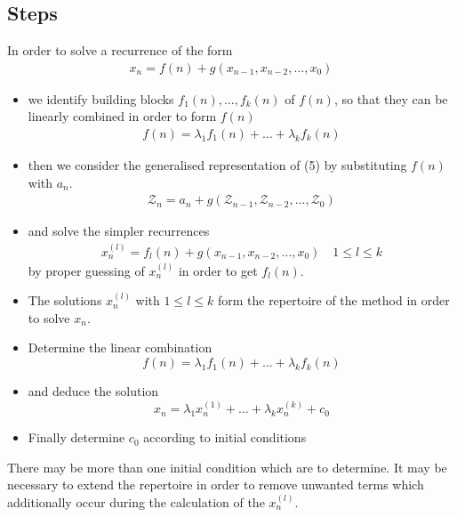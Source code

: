 \subsection{Steps}
In order to solve a recurrence of the form
\begin{align*}
x_n=f(n)+g(x_{n-1},x_{n-2},\ldots,x_0)\tag{5}
\end{align*}
\begin{itemize}
    \item we identify building blocks $f_1(n),\ldots,f_k(n)$ of $f(n)$, so that they can be linearly combined in order to form $f(n)$
    \begin{align*}
    f(n)=\lambda_1 f_1(n)+\ldots+\lambda_k f_k(n)
    \end{align*}
    
    \item then we consider the generalised representation of (5) by substituting $f(n)$ with $a_n$.
    \begin{align*}
    \mathcal{Z}_n=a_n+g(\mathcal{Z}_{n-1},\mathcal{Z}_{n-2},\ldots,\mathcal{Z}_0)
    \end{align*}
    
    \item and solve the simpler recurrences
    \begin{align*}
    x_n^{(l)}=f_l(n)+g(x_{n-1},x_{n-2},\ldots,x_0)\quad 1 \leq l \leq k
    \end{align*}
    by proper guessing of $x_n^{(l)}$ in order to get $f_l(n)$.
    
    \item The solutions $x_n^{(l)}$ with $1\leq l \leq k$ form the repertoire of the method in order to solve $x_n$.
    
    \item Determine the linear combination 
    $$f(n)=\lambda_1 f_1(n)+\ldots+\lambda_k f_k(n)$$
    
    \item and deduce the solution
    $$x_n=\lambda_1 x_n^{(1)}+\ldots+\lambda_k x_n^{(k)}+c_0$$
    
    \item Finally determine $c_0$ according to initial conditions
\end{itemize}
\begin{remark} There may be more than one initial condition which are to determine. It may be necessary to extend the repertoire in order to remove unwanted terms which additionally occur during the calculation of the $x_n^{(l)}$.
\end{remark}
